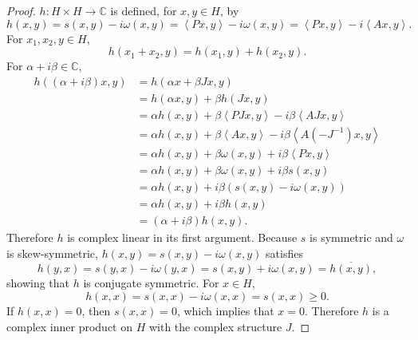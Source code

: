 \documentclass{article}
\newcommand{\inner}[2]{\left\langle #1, #2 \right\rangle}
\theoremstyle{definition}
\begin{document}
\begin{proof}
$h:H \times H \to \mathbb{C}$ is defined, for $x,y \in H$, by
\[
h(x,y) = s(x,y)- i\omega(x,y) = \inner{Px}{y}- i\omega(x,y)
=\inner{Px}{y}-i\inner{Ax}{y}.
\]
For $x_1,x_2, y \in H$,
\[
h(x_1+x_2,y) = h(x_1,y)+h(x_2,y).
\]
For $\alpha+i\beta \in \mathbb{C}$,
\begin{align*}
h((\alpha+i\beta)x,y)&=h(\alpha x+\beta Jx,y)\\
&=h(\alpha x,y)+\beta h(Jx,y)\\
&=\alpha h(x,y) + \beta \inner{PJx}{y}- i\beta \inner{AJx}{y}\\
&=\alpha h(x,y) + \beta \inner{Ax}{y}-i\beta \inner{A(-J^{-1})x}{y}\\
&=\alpha h(x,y) + \beta \omega(x,y) + i\beta \inner{Px}{y}\\
&=\alpha h(x,y) + \beta \omega(x,y) + i\beta s(x,y)\\
&=\alpha h(x,y) + i\beta (s(x,y)-i\omega(x,y))\\
&=\alpha h(x,y) + i\beta h(x,y)\\
&=(\alpha+i\beta) h(x,y).
\end{align*}
Therefore $h$ is complex linear in its first argument. 
Because $s$ is symmetric and $\omega$ is skew-symmetric, $h(x,y) = s(x,y)-i\omega(x,y)$ satisfies
\[
h(y,x) = s(y,x)-i\omega(y,x) = s(x,y) + i \omega(x,y) = \overline{h(x,y)},
\]
showing that $h$ is conjugate symmetric. For $x \in H$,
\[
h(x,x) = s(x,x)-i\omega(x,x) = s(x,x) \geq 0.
\]
If $h(x,x)=0$, then
$s(x,x)=0$, which implies that $x=0$. Therefore $h$ is a complex inner product on $H$ with the complex structure $J$.


\end{proof}
\end{document}
